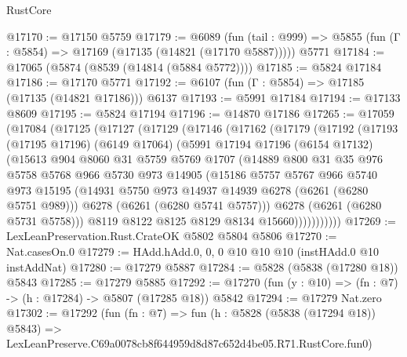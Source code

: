 \begin{lexlean}{RustCore}
\begin{coremodule}
@17170 := @17150 @5759
@17179 := @6089
    (fun (tail : @999) => @5855 (fun (Γ : @5854) => @17169 (@17135 (@14821 (@17170 @5887)))))
    @5771
@17184 := @17065 (@5874 (@8539 (@14814 (@5884 @5772))))
@17185 := @5824 @17184
@17186 := @17170 @5771
@17192 := @6107 (fun (Γ : @5854) => @17185 (@17135 (@14821 @17186))) @6137
@17193 := @5991 @17184
@17194 := @17133 @8609
@17195 := @5824 @17194
@17196 := @14870 @17186
@17265 := @17059
    (@17084
      (@17125
        (@17127
          (@17129
            (@17146
              (@17162
                (@17179
                  (@17192
                    (@17193
                      (@17195 @17196)
                      (@6149 @17064)
                      (@5991
                        @17194
                        @17196
                        (@6154 @17132)
                        (@15613
                          @904
                          @8060
                          @31
                          @5759
                          @5769
                          @1707
                          (@14889
                            @800
                            @31
                            @35
                            @976
                            @5758
                            @5768
                            @966
                            @5730
                            @973
                            @14905
                            (@15186
                              @5757
                              @5767
                              @966
                              @5740
                              @973
                              @15195
                              (@14931 @5750 @973 @14937 @14939 @6278 (@6261 (@6280 @5751 @989)))
                              @6278
                              (@6261 (@6280 @5741 @5757)))
                            @6278
                            (@6261 (@6280 @5731 @5758)))
                          @8119
                          @8122
                          @8125
                          @8129
                          @8134
                          @15660)))))))))))
@17269 := LexLeanPreservation.Rust.CrateOK @5802 @5804 @5806
@17270 := Nat.casesOn.{0}
@17279 := HAdd.hAdd.{0, 0, 0} @10 @10 @10 (instHAdd.{0} @10 instAddNat)
@17280 := @17279 @5887
@17284 := @5828 (@5838 (@17280 @18)) @5843
@17285 := @17279 @5885
@17292 := @17270 (fun (y : @10) => (fn : @7) -> (h : @17284) -> @5807 (@17285 @18)) @5842
@17294 := @17279 Nat.zero
@17302 := @17292
    (fun (fn : @7) =>
    fun (h : @5828 (@5838 (@17294 @18)) @5843) =>
    LexLeanPreserve.C69a0078cb8f644959d8d87c652d4be05.R71.RustCore.fun0)

\end{coremodule}
\end{lexlean}
